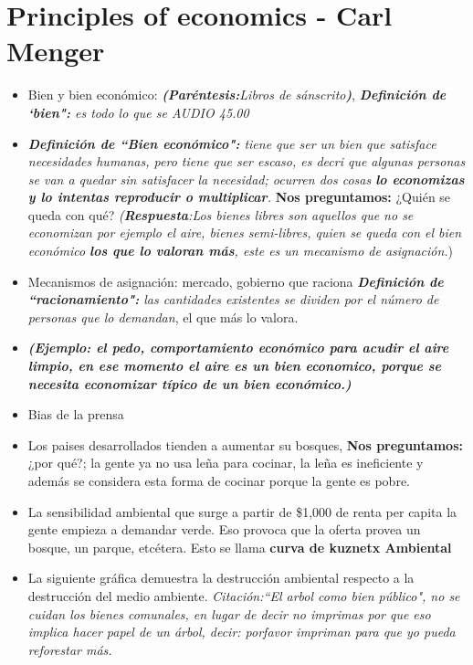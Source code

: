 \section{Principles of economics - Carl Menger}
\begin{itemize}
    \item Bien y bien económico: \emph{\textbf{(Paréntesis:}Libros de sánscrito\textbf{)}}, \emph{\textbf{Definición de `bien":} es todo lo que se AUDIO 45.00}
    \item \emph{\textbf{Definición de ``Bien económico":} tiene que ser un bien que satisface necesidades humanas, pero tiene que ser escaso, es decri que algunas personas se van a quedar sin satisfacer la necesidad; ocurren dos cosas \textbf{lo economizas y lo intentas reproducir o multiplicar}.} \textbf{Nos preguntamos:} ¿Quién se queda con qué? \emph{(\textbf{Respuesta}:Los bienes libres son aquellos que no se economizan por ejemplo el aire, bienes semi-libres, quien se queda con el bien económico \textbf{los que lo valoran más}, este es un mecanismo de asignación.})
    \item Mecanismos de asignación: mercado, gobierno que raciona \emph{\textbf{Definición de ``racionamiento":} las cantidades existentes se dividen por el número de personas que lo demandan}, el que más lo valora.
    \item \textbf{\emph{(Ejemplo: el pedo, comportamiento económico para acudir el aire limpio, en ese momento el aire es un bien economico, porque se necesita economizar típico de un bien económico.)}}
    \item Bias de la prensa
    \item Los paises desarrollados tienden a aumentar su bosques, \textbf{Nos preguntamos:} ¿por qué?; la gente ya no usa leña para cocinar, la leña es ineficiente y además se considera esta forma de cocinar porque la gente es pobre.
    \item La sensibilidad ambiental que surge a partir de \$1,000 de renta per capita la gente empieza a demandar verde. Eso provoca que la oferta provea un bosque, un parque, etcétera. Esto se llama \textbf{curva de kuznetx Ambiental}
    \item La siguiente gráfica demuestra la destrucción ambiental respecto a la destrucción del medio ambiente. \emph{Citación:``El arbol como bien público", no se cuidan los bienes comunales, en lugar de decir no imprimas por que eso implica hacer papel de un árbol, decir: porfavor impriman para que yo pueda reforestar más.} 
    \begin{figure}[htbp]

\end{figure}
\end{itemize}
